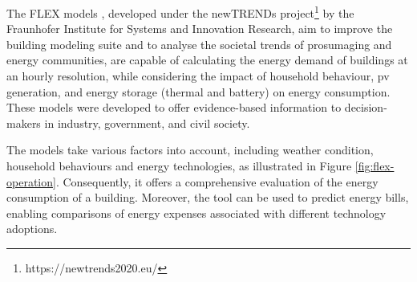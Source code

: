 The FLEX models \cite{newtrends}, developed under the newTRENDs project\footnote{https://newtrends2020.eu/} by the Fraunhofer Institute for Systems and Innovation Research, 
aim to improve the building modeling suite and to analyse the societal trends of prosumaging and energy communities, 
are capable of calculating the energy demand of buildings at an hourly resolution,
while considering the impact of household behaviour, \gls{pv} generation, and energy storage (thermal and battery) on energy consumption. 
These models were developed to offer evidence-based information to decision-makers in industry, government, and civil society. 

The models take various factors into account, including weather condition, household behaviours and energy technologies, as illustrated in Figure \ref{fig:flex-operation}.
Consequently, it offers a comprehensive evaluation of the energy consumption of a building. 
Moreover, the tool can be used to predict energy bills, enabling comparisons of energy expenses associated with different technology adoptions. 



